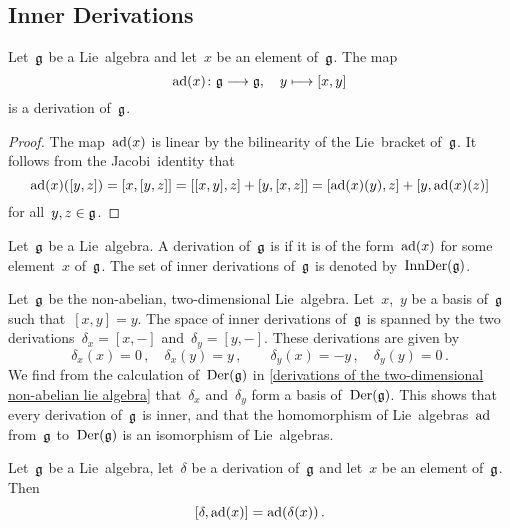 \subsection{Inner Derivations}

\begin{proposition}
	\label{lie algebras act adjoint by derivations}
	
	Let~$\mathfrak{g}$ be a Lie~algebra and let~$x$ be an element of~$\mathfrak{g}$.
	The map
	\[
		\ad(x)
		\colon
		\glie
		\to
		\glie,
		\quad
		y
		\mapsto
		[x,y]
	\]
	is a derivation of~$\mathfrak{g}$.
\end{proposition}


\begin{proof}
	The map~$\operatorname{ad}(x)$ is linear by the bilinearity of the Lie~bracket of~$\mathfrak{g}$.
	It follows from the Jacobi~identity that
	\[
		\operatorname{ad}(x)([y,z])
		=
		[x,[y,z]]
		=
		[[x,y],z] + [y,[x,z]] \\
		=
		[\operatorname{ad}(x)(y), z] + [y, \operatorname{ad}(x)(z)]
	\]
	for all~$y,z \in \mathfrak{g}$.
\end{proof}


\begin{definition}
	\label{definition of inner derivations}
 Let~$\mathfrak{g}$ be a Lie~algebra.
 A derivation of~$\mathfrak{g}$ is  if it is of the form~$\operatorname{ad}(x)$ for some element~$x$ of~$\mathfrak{g}$.
 The set of inner derivations of~$\mathfrak{g}$ is denoted by~$\operatorname{InnDer}(\mathfrak{g})$.
\end{definition}


\begin{example}
	Let~$\mathfrak{g}$ be the non-abelian, two-dimensional Lie~algebra.
	Let~$x$,~$y$ be a basis of~$\mathfrak{g}$ such that~$[x,y] = y$.
	The space of inner derivations of~$\mathfrak{g}$ is spanned by the two derivations~$\delta_x = [x,-]$ and~$\delta_y = [y,-]$.
	These derivations are given by
	\[
		\delta_x(x) = 0 \,,
		\quad
		\delta_x(y) = y \,,
		\qquad
		\delta_y(x) = -y \,,
		\quad
		\delta_y(y) = 0 \,.
	\]
	We find from the calculation of~$\operatorname{Der}(\mathfrak{g})$ in \cref{derivations of the two-dimensional non-abelian lie algebra} that~$\delta_x$ and~$\delta_y$ form a basis of~$\operatorname{Der}(\mathfrak{g})$.
	This shows that every derivation of~$\mathfrak{g}$ is inner, and that the homomorphism of Lie~algebras~$\operatorname{ad}$ from~$\mathfrak{g}$ to~$\operatorname{Der}(\mathfrak{g})$ is an isomorphism of Lie~algebras.
\end{example}


\begin{lemma}
	\label{commutator of any derivation and inner derivation}
	Let~$\mathfrak{g}$ be a Lie~algebra, let~$\delta$ be a derivation of~$\mathfrak{g}$ and let~$x$ be an element of~$\mathfrak{g}$.
	Then
	\[
		[\delta, \operatorname{ad}(x)] = \operatorname{ad}(\delta(x)) \,.
	\]
\end{lemma}


